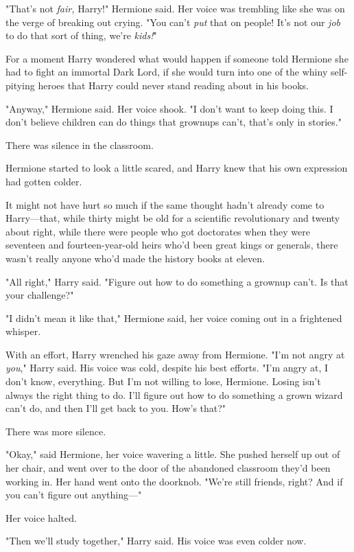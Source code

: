 "That's not \emph{fair,} Harry!" Hermione said. Her voice was trembling like 
she was on the verge of breaking out crying. "You can't \emph{put} that on 
people! It's not our \emph{job} to do that sort of thing, we're \emph{kids!}"

For a moment Harry wondered what would happen if someone told Hermione she had 
to fight an immortal Dark Lord, if she would turn into one of the whiny 
self-pitying heroes that Harry could never stand reading about in his books.

"Anyway," Hermione said. Her voice shook. "I don't want to keep doing this. I 
don't believe children can do things that grownups can't, that's only in 
stories."

There was silence in the classroom.

Hermione started to look a little scared, and Harry knew that his own 
expression had gotten colder.

It might not have hurt so much if the same thought hadn't already come to 
Harry---that, while thirty might be old for a scientific revolutionary and 
twenty about right, while there were people who got doctorates when they were 
seventeen and fourteen-year-old heirs who'd been great kings or generals, there 
wasn't really anyone who'd made the history books at eleven.

"All right," Harry said. "Figure out how to do something a grownup can't. Is 
that your challenge?"

"I didn't mean it like that," Hermione said, her voice coming out in a 
frightened whisper.

With an effort, Harry wrenched his gaze away from Hermione. "I'm not angry at 
\emph{you}," Harry said. His voice was cold, despite his best efforts. "I'm 
angry at, I don't know, everything. But I'm not willing to lose, Hermione. 
Losing isn't always the right thing to do. I'll figure out how to do something 
a grown wizard can't do, and then I'll get back to you. How's that?"

There was more silence.

"Okay," said Hermione, her voice wavering a little. She pushed herself up out 
of her chair, and went over to the door of the abandoned classroom they'd been 
working in. Her hand went onto the doorknob. "We're still friends, right? And 
if you can't figure out anything---"

Her voice halted.

"Then we'll study together," Harry said. His voice was even colder now.

